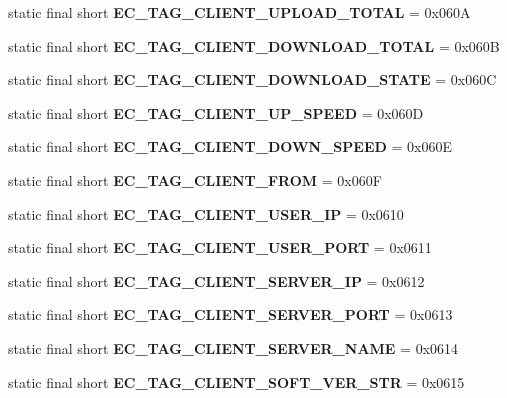 \begin{DoxyCompactItemize}
\item 
static final short {\bfseries EC\_\-TAG\_\-CLIENT\_\-UPLOAD\_\-TOTAL} = 0x060A\label{interfaceECCodes_a96b394160ebb12309451bf6b300e253a}

\item 
static final short {\bfseries EC\_\-TAG\_\-CLIENT\_\-DOWNLOAD\_\-TOTAL} = 0x060B\label{interfaceECCodes_a0ab72e55183b769b58d15375bfcb7a6c}

\item 
static final short {\bfseries EC\_\-TAG\_\-CLIENT\_\-DOWNLOAD\_\-STATE} = 0x060C\label{interfaceECCodes_af57fd5dcd4251faa2129f369b1d03020}

\item 
static final short {\bfseries EC\_\-TAG\_\-CLIENT\_\-UP\_\-SPEED} = 0x060D\label{interfaceECCodes_a07a3c72d9bd335691f16b6891336f70d}

\item 
static final short {\bfseries EC\_\-TAG\_\-CLIENT\_\-DOWN\_\-SPEED} = 0x060E\label{interfaceECCodes_a38631365671403147019ed9ee8493a4a}

\item 
static final short {\bfseries EC\_\-TAG\_\-CLIENT\_\-FROM} = 0x060F\label{interfaceECCodes_ac7cde3773120b2cc383c6090eceb0eb0}

\item 
static final short {\bfseries EC\_\-TAG\_\-CLIENT\_\-USER\_\-IP} = 0x0610\label{interfaceECCodes_a96df4ddf630217859a51e1ca6c2ca513}

\item 
static final short {\bfseries EC\_\-TAG\_\-CLIENT\_\-USER\_\-PORT} = 0x0611\label{interfaceECCodes_ab1085d6bce17ce46e7d7c4fcfd496723}

\item 
static final short {\bfseries EC\_\-TAG\_\-CLIENT\_\-SERVER\_\-IP} = 0x0612\label{interfaceECCodes_ae2d3601e13792daff4cd2a68642936bc}

\item 
static final short {\bfseries EC\_\-TAG\_\-CLIENT\_\-SERVER\_\-PORT} = 0x0613\label{interfaceECCodes_a52a169b4bc1d7ce23843e6978585991a}

\item 
static final short {\bfseries EC\_\-TAG\_\-CLIENT\_\-SERVER\_\-NAME} = 0x0614\label{interfaceECCodes_a6bdf45f11956ebb4877b4890ca637e7c}

\item 
static final short {\bfseries EC\_\-TAG\_\-CLIENT\_\-SOFT\_\-VER\_\-STR} = 0x0615\label{interfaceECCodes_ac70c942d9b68e3484034d9f598d7c5d4}


\end{DoxyCompactItemize}
